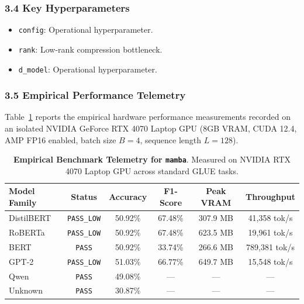 \subsubsection*{3.4 Key Hyperparameters}
\begin{itemize}
    \item \texttt{config}: Operational hyperparameter.
    \item \texttt{rank}: Low-rank compression bottleneck.
    \item \texttt{d\_model}: Operational hyperparameter.
\end{itemize}

\subsubsection*{3.5 Empirical Performance Telemetry}
Table~\ref{tab:telemetry_mamba} reports the empirical hardware performance measurements recorded on an isolated NVIDIA GeForce RTX 4070 Laptop GPU (8GB VRAM, CUDA 12.4, AMP FP16 enabled, batch size $B=4$, sequence length $L=128$).

\begin{table}[h]
\centering
\small
\caption{\textbf{Empirical Benchmark Telemetry for \texttt{mamba}}. Measured on NVIDIA RTX 4070 Laptop GPU across standard GLUE tasks.}
\label{tab:telemetry_mamba}
\begin{tabular*}{\columnwidth}{@{\extracolsep{\fill}}lccccc}
\toprule
\textbf{Model Family} & \textbf{Status} & \textbf{Accuracy} & \textbf{F1-Score} & \textbf{Peak VRAM} & \textbf{Throughput} \\
\midrule
DistilBERT & \texttt{PASS\_LOW} & 50.92\% & 67.48\% & 307.9 MB & 41,358 tok/s \\
RoBERTa & \texttt{PASS\_LOW} & 50.92\% & 67.48\% & 623.5 MB & 19,961 tok/s \\
BERT & \texttt{PASS} & 50.92\% & 33.74\% & 266.6 MB & 789,381 tok/s \\
GPT-2 & \texttt{PASS\_LOW} & 51.03\% & 66.77\% & 649.7 MB & 15,548 tok/s \\
Qwen & \texttt{PASS} & 49.08\% & --- & --- & --- \\
Unknown & \texttt{PASS} & 30.87\% & --- & --- & --- \\
\bottomrule
\end{tabular*}
\end{table}

